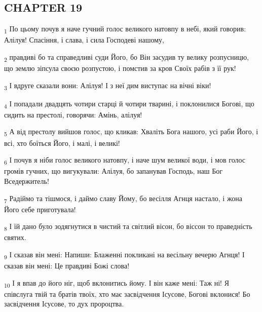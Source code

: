 \subsection{CHAPTER 19}
\begin{tcolorbox}
\textsubscript{1} По цьому почув я наче гучний голос великого натовпу в небі, який говорив: Алілуя! Спасіння, і слава, і сила Господеві нашому,
\end{tcolorbox}
\begin{tcolorbox}
\textsubscript{2} правдиві бо та справедливі суди Його, бо Він засудив ту велику розпусницю, що землю зіпсула своєю розпустою, і помстив за кров Своїх рабів з її рук!
\end{tcolorbox}
\begin{tcolorbox}
\textsubscript{3} І вдруге сказали вони: Алілуя! І з неї дим виступає на вічні віки!
\end{tcolorbox}
\begin{tcolorbox}
\textsubscript{4} І попадали двадцять чотири старці й чотири тварині, і поклонилися Богові, що сидить на престолі, говорячи: Амінь, алілуя!
\end{tcolorbox}
\begin{tcolorbox}
\textsubscript{5} А від престолу вийшов голос, що кликав: Хваліть Бога нашого, усі раби Його, і всі, хто боїться Його, і малі, і великі!
\end{tcolorbox}
\begin{tcolorbox}
\textsubscript{6} І почув я ніби голос великого натовпу, і наче шум великої води, і мов голос громів гучних, що вигукували: Алілуя, бо запанував Господь, наш Бог Вседержитель!
\end{tcolorbox}
\begin{tcolorbox}
\textsubscript{7} Радіймо та тішмося, і даймо славу Йому, бо весілля Агнця настало, і жона Його себе приготувала!
\end{tcolorbox}
\begin{tcolorbox}
\textsubscript{8} І їй дано було зодягнутися в чистий та світлий вісон, бо віссон то праведність святих.
\end{tcolorbox}
\begin{tcolorbox}
\textsubscript{9} І сказав він мені: Напиши: Блаженні покликані на весільну вечерю Агнця! І сказав він мені: Це правдиві Божі слова!
\end{tcolorbox}
\begin{tcolorbox}
\textsubscript{10} І я впав до його ніг, щоб вклонитись йому. І він каже мені: Таж ні! Я співслуга твій та братів твоїх, хто має засвідчення Ісусове, Богові вклонися! Бо засвідчення Ісусове, то дух пророцтва.
\end{tcolorbox}
